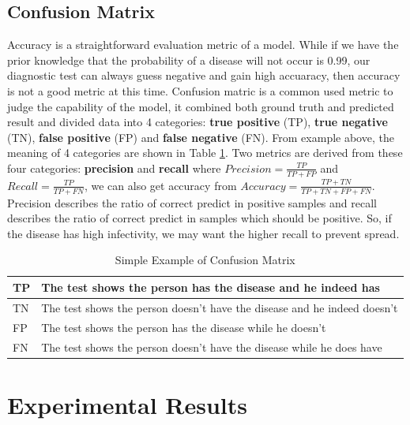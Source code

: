\documentclass[12pt,a4paper]{article}
\begin{document}
\subsection{Confusion Matrix}
Accuracy is a straightforward evaluation metric of a model. While if we have the prior knowledge that the probability of a disease will not occur is 0.99, our diagnostic test can always guess negative and gain high accuaracy, then accuracy is not a good metric at this time. Confusion matric is a common used metric to judge the capability of the model, it combined both ground truth and predicted result and divided data into 4 categories: \textbf{true positive} (TP), \textbf{true negative} (TN), \textbf{false positive} (FP) and \textbf{false negative} (FN). From example above, the meaning of 4 categories are shown in Table \ref{table:confuse}. Two metrics are derived from these four categories: \textbf{precision} and \textbf{recall} where $Precision=\frac{TP}{TP+FP}$ and $Recall=\frac{TP}{TP+FN}$, we can also get accuracy from $Accuracy=\frac{TP+TN}{TP+TN+FP+FN}$. Precision describes the ratio of correct predict in positive samples and recall describes the ratio of correct predict in samples which should be positive. So, if the disease has high infectivity, we may want the higher recall to prevent spread.

\begin{table}[hbt]
\begin{tabular}{|l|l|}
\hline
TP & The test shows the person has the disease and he indeed has              \\ \hline
TN & The test shows the person doesn't have the disease and he indeed doesn't \\ \hline
FP & The test shows the person has the disease while he doesn't               \\ \hline
FN & The test shows the person doesn't have the disease while he does have    \\ \hline
\end{tabular}
\caption{Simple Example of Confusion Matrix}
\label{table:confuse}
\end{table}

\section{Experimental Results} \label{sec:res}
\end{document}
